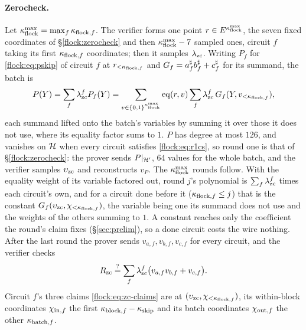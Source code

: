\paragraph{Zerocheck.} Let $\kappa_{\mathrm{flock}}^{\max}=\max_f\kappa_{\mathrm{flock},f}$. The verifier forms one point $r\in E^{\kappa_{\mathrm{flock}}^{\max}}$, the seven fixed coordinates of \S\ref{flock:zerocheck} and then $\kappa_{\mathrm{flock}}^{\max}-7$ sampled ones, circuit $f$ taking its first $\kappa_{\mathrm{flock},f}$ coordinates; then it samples $\lambda_{\mathrm{zc}}$. Writing $P_f$ for \eqref{flock:eq:pskip} of circuit $f$ at $r_{<\kappa_{\mathrm{flock},f}}$ and $G_f=a^{\sharp}_fb^{\sharp}_f+c^{\sharp}_f$ for its summand, the batch is
\[
P(Y)=\sum_f\lambda_{\mathrm{zc}}^{f}P_f(Y)=\sum_{v\in\{0,1\}^{\kappa_{\mathrm{flock}}^{\max}}}\operatorname{eq}(r,v)\sum_f\lambda_{\mathrm{zc}}^{f}\,G_f(Y,v_{<\kappa_{\mathrm{flock},f}}),
\]
each summand lifted onto the batch's variables by summing it over those it does not use, where its equality factor sums to $1$. $P$ has degree at most $126$, and vanishes on $\mathcal{H}$ when every circuit satisfies \eqref{flock:eq:r1cs}, so round one is that of \S\ref{flock:zerocheck}: the prover sends $P|_{\mathcal{H}'}$, $64$ values for the whole batch, and the verifier samples $\upsilon_{\mathrm{zc}}$ and reconstructs $v_P$. The $\kappa_{\mathrm{flock}}^{\max}$ rounds follow. With the equality weight of its variable factored out, round $j$'s polynomial is $\sum_f\lambda_{\mathrm{zc}}^f$ times each circuit's own, and for a circuit done before it ($\kappa_{\mathrm{flock},f}\le j$) that is the constant $G_f(\upsilon_{\mathrm{zc}},\chi_{<\kappa_{\mathrm{flock},f}})$, the variable being one its summand does not use and the weights of the others summing to $1$. A constant reaches only the coefficient the round's claim fixes (\S\ref{sec:prelim}), so a done circuit costs the wire nothing. After the last round the prover sends $v_{a,f},v_{b,f},v_{c,f}$ for every circuit, and the verifier checks
\begin{equation}\label{flock:eq:batch-zc-terminal}
R_{\mathrm{zc}}\stackrel{?}{=}\sum_f\lambda_{\mathrm{zc}}^{f}\bigl(v_{a,f}v_{b,f}+v_{c,f}\bigr).
\end{equation}
Circuit $f$'s three claims \eqref{flock:eq:zc-claims} are at $(\upsilon_{\mathrm{zc}},\chi_{<\kappa_{\mathrm{flock},f}})$, its within-block coordinates $\chi_{\mathrm{in},f}$ the first $\kappa_{\mathrm{block},f}-\kappa_{\mathrm{skip}}$ and its batch coordinates $\chi_{\mathrm{out},f}$ the other $\kappa_{\mathrm{batch},f}$.

